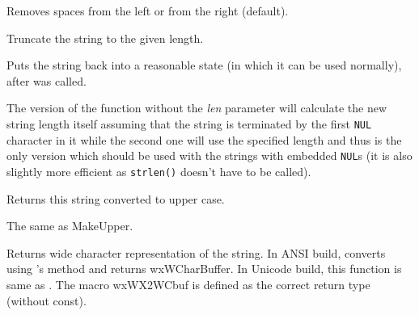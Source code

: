 \label{wxstringtrim}


Removes spaces from the left or from the right (default).

\label{wxstringtruncate}


Truncate the string to the given length.

\label{wxstringungetwritebuf}



Puts the string back into a reasonable state (in which it can be used
normally), after
\rtfsp{} was called.

The version of the function without the {\it len} parameter will calculate the
new string length itself assuming that the string is terminated by the first
{\tt NUL} character in it while the second one will use the specified length
and thus is the only version which should be used with the strings with
embedded {\tt NUL}s (it is also slightly more efficient as {\tt strlen()} 
doesn't have to be called).

\label{wxstringupper}


Returns this string converted to upper case.

\label{wxstringuppercase}


The same as MakeUpper.

\label{wxstringwcstr}



Returns wide character representation of the string.
In ANSI build, converts using 's 
method and returns wxWCharBuffer. In Unicode build, this function is same
as .
The macro wxWX2WCbuf is defined as the correct return type (without const).

